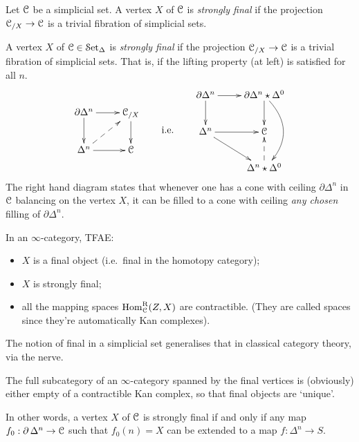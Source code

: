 \begin{1.2.12 Initial and final objects}
\begin{definition}\label{strongfin}
Let $\operatorname{\mathcal{C}}$ be a simplicial set. A
vertex $X$ of $\operatorname{\mathcal{C}}$ is {\it strongly final} if the projection $\operatorname{\mathcal{C}}_{/X}
\rightarrow \operatorname{\mathcal{C}}$ is a trivial fibration of simplicial sets. 
\end{definition}
\begin{shaded}
A
vertex $X$ of $\operatorname{\mathcal{C}}\in\operatorname{\mathcal{S}et_{\Delta}}$ is {\it strongly final} if the projection $\operatorname{\mathcal{C}}_{/X}
\rightarrow \operatorname{\mathcal{C}}$ is a trivial fibration of simplicial sets. That is, if the lifting property (at left) is satisfied for all $n$.
\[\vcenter{\xymatrix{
\partial\Delta^n
\ar[r]
\ar[d]
&%
\calc_{/X}
\ar[d]
\\%
\Delta^n
\ar@{-->}[ur]
\ar[r]
&%
\calc%
}}\textup{\qquad i.e.\qquad }
\vcenter{\xymatrix{
\partial\Delta^n
\ar[d]
\ar[r]
&%
\partial\Delta^n\join\Delta^0
\ar[d]
\ar@/^2em/[dd]
\\%
\Delta^n
\ar[r]
\ar[rd]
&%
\calc\\%
&%
\Delta^n\join\Delta^0
\ar@{-->}[u]
}}\]
The right hand diagram states that whenever one has a cone with ceiling $\partial\Delta^n$ in $\mathcal{C}$ balancing on the vertex $X$, it can be filled to a cone with ceiling \emph{any chosen} filling of $\partial\Delta^n$.

In an $\infty$-category, TFAE:
\begin{itemize}\squishlist
\setlength{\parindent}{.25in}
\item $X$ is a final object (i.e.\ final in the homotopy category);
\item $X$ is strongly final;
\item all the mapping spaces $\operatorname{Hom}^{\operatorname{R}}_{\operatorname{\mathcal{C}}}(Z,X)$ are contractible. (They are called spaces since they're automatically Kan complexes).
\end{itemize}
\begin{itemise}
\setlength{\parindent}{.25in}
\item The notion of final in a simplicial set generalises that in classical category theory, via the nerve.
\item The full subcategory of an $\infty$-category spanned by the final vertices is (obviously) either empty of a contractible Kan complex, so that final objects are `unique'.
\end{itemise}
\end{shaded}
In other words, a vertex $X$ of $\operatorname{\mathcal{C}}$ is strongly final if and only if any
map $f_0: \operatorname{\partial} \Delta^n \rightarrow \operatorname{\mathcal{C}}$ such that
$f_0(n) = X$ can be extended to a map $f: \Delta^n \rightarrow S$.


\end{1.2.12 Initial and final objects}
